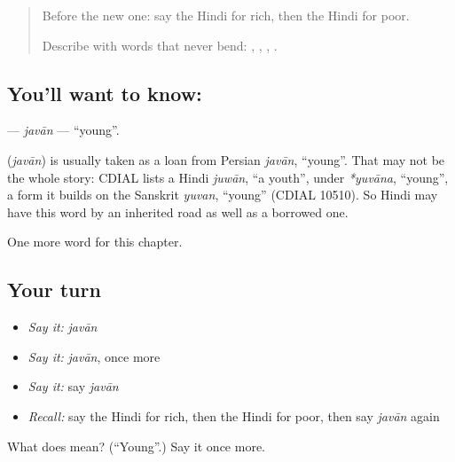 \label{lesson:HI-C157-javan}



\begin{quote}
Before the new one: say the Hindi for rich, then the Hindi for poor.

Describe with words that never bend: \textbf{}, \textbf{}, \textbf{}, \textbf{}.
\end{quote}

\subsection*{You'll want to know: }
\textbf{} — \emph{javān} — \textquotedblleft{}young\textquotedblright{}.

\begin{cousinweb}
\textbf{} (\emph{javān}) is usually taken as a loan from Persian \emph{javān}, \textquotedblleft{}young\textquotedblright{}. That may not be the whole story: CDIAL lists a Hindi \emph{juwān}, \textquotedblleft{}a youth\textquotedblright{}, under \emph{*yuvāna}, \textquotedblleft{}young\textquotedblright{}, a form it builds on the Sanskrit \emph{yuvan}, \textquotedblleft{}young\textquotedblright{} (CDIAL 10510). So Hindi may have this word by an inherited road as well as a borrowed one.
\end{cousinweb}

\begin{grammarlens}[title={What you've built}]
One more word for this chapter.
\end{grammarlens}

\subsection*{Your turn}
\begin{itemize}
\raggedright
  \item \emph{Say it:} \emph{javān}
  \item \emph{Say it:} \emph{javān}, once more
  \item \emph{Say it:} say \emph{javān}
  \item \emph{Recall:} say the Hindi for rich, then the Hindi for poor, then say \emph{javān} again
\end{itemize}

\begin{tcolorbox}[breakable,colback=teal!4,colframe=teal!35!black,title={Before you move on}]
What does  mean? (\textquotedblleft{}Young\textquotedblright{}.) Say it once more.
\end{tcolorbox}
